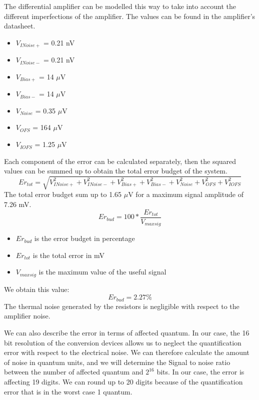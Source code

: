 \documentclass{article}[12pt]
\begin{document}
The differential amplifier can be modelled this way to take into account the different imperfections of the amplifier.
The values can be found in the amplifier's datasheet.
\begin{itemize}
    \item $V_{INoise+}$ = 0.21 nV
    \item $V_{INoise-}$ = 0.21 nV
    \item $V_{Bias+}$ = 14 $\mu$V
    \item $V_{Bias-}$ = 14 $\mu$V
    \item $V_{Noise}$ = 0.35 $\mu$V
    \item $V_{OFS}$ = 164 $\mu$V
    \item $V_{IOFS}$ = 1.25 $\mu$V
\end{itemize}
Each component of the error can be calculated separately, then the squared values can be summed up to obtain the total error budget of the system.
\begin{equation}
    Er_{tot}=\sqrt{V_{INoise+}^2 + V_{INoise-}^2 + V_{Bias+}^2 + V_{Bias-}^2 + V_{Noise}^2 + V_{OFS}^2 + V_{IOFS}^2}
\end{equation}
The total error budget sum up to 1.65 $\mu$V for a maximum signal amplitude of 7.26 mV.
\begin{equation}
    Er_{bud}=100*\dfrac{Er_{tot}}{V_{maxsig}}
\end{equation}
\begin{itemize}
    \item $Er_{bud}$ is the error budget in percentage
    \item $Er_{tot}$ is the total error in mV
    \item $V_{maxsig}$ is the maximum value of the useful signal
\end{itemize}
We obtain this value:
\begin{equation}
    Er_{bud}=2.27\%
\end{equation}
The thermal noise generated by the resistors is negligible with respect to the amplifier noise.

We can also describe the error in terms of affected quantum. In our case, the 16 bit resolution of the conversion devices allows us to neglect the quantification error with respect to the electrical noise. We can therefore calculate the amount of noise in quantum units, and we will determine the Signal to noise ratio between the number of affected quantum and $2^{16}$ bits. In our case, the error is affecting 19 digits. We can round up to 20 digits because of the quantification error that is in the worst case 1 quantum. 
\end{document}
